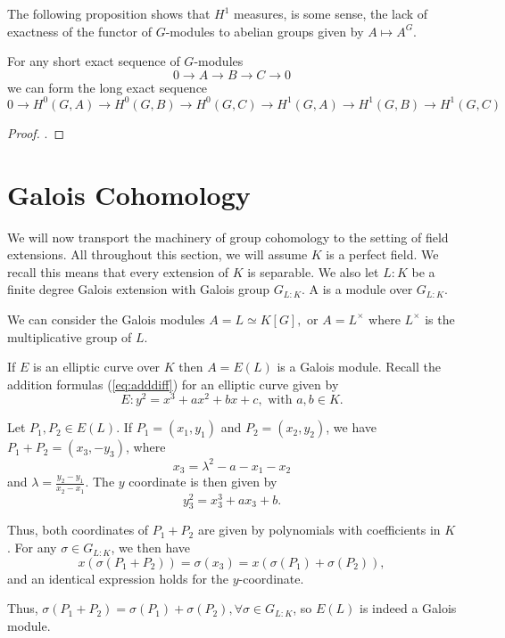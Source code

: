 \documentclass[12pt, a4paper]{report}
\begin{document}
The following proposition shows that $H^1$ measures, is some sense, the lack of
exactness of the functor of $G$-modules to abelian groups given by $A \mapsto A^G.$

\begin{prop}
  For any short exact sequence of $G$-modules
  \[ 0 \rightarrow A \rightarrow B \rightarrow C \rightarrow 0\]
  we can form the long exact sequence
  \[ 0 \rightarrow H^0(G, A) \rightarrow H^0(G,B) \rightarrow H^0(G,C)
    \rightarrow H^1(G, A) \rightarrow H^1(G,B) \rightarrow H^1(G,C) \]
\end{prop}

\begin{proof}
  \cite[See][Appendix B, Pages 416-417]{arithmetic}.
\end{proof}

\section{Galois Cohomology}

We will now transport the machinery of group cohomology to the setting of
field extensions.
All throughout this section, we will assume $K$ is a perfect field. We recall
this means that every extension of $K$ is separable. 
We also let $L : K$ be a finite degree Galois
extension with Galois group $G_{L:K}$.
A  is a module over $G_{L:K}$.

\begin{example}
  We can consider the Galois modules $A = L \simeq K[G], $ or $A =
  L^{\times}$ where $L^{\times}$ is the multiplicative group of $L$.
\end{example}

\begin{example}
  If $E$ is an elliptic curve over $K$ then $A = E(L)$ is a Galois module.
  Recall the addition formulas (\autoref{eq:adddiff}) for an elliptic curve given by 
  \[E: y^2 = x^3 + ax^2 + bx + c, \text{ with } a, b \in K.\]
  
  Let $P_1, P_2 \in E(L)$. 
  If $P_1 = (x_1, y_1)$ and $P_2 = (x_2,y_2)$, we have $P_1+P_2 = (x_3,-y_3)$,
  where
  \[x_3 = \lambda^2 - a - x_1 - x_2\]
  and $\lambda = \frac{y_2-y_1}{x_2-x_1}.$ The $y$ coordinate is then given by
  \[y_3^2 = x_3^3 + ax_3 + b.\]
  
  Thus, both coordinates of $P_1+P_2$ are given by polynomials with coefficients
  in $K$. 
  For any $\sigma \in G_{L:K}$, we then have
  \[x(\sigma(P_1+P_2)) = \sigma(x_3) = x(\sigma(P_1) + \sigma(P_2)),\]
  and an identical expression holds for the $y$-coordinate.
  
  Thus, $\sigma(P_1+P_2) = \sigma(P_1) + \sigma(P_2), \forall \sigma \in
  G_{L:K}$, so $E(L)$ is indeed a Galois module. 

\end{example}
\end{document}
